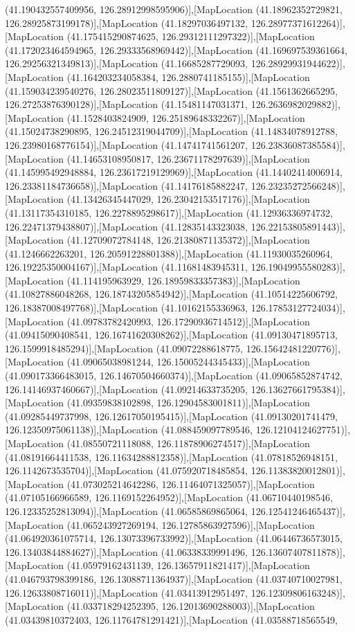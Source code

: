 (41.190432557409956, 126.28912998595906)],[MapLocation (41.18962352729821, 126.28925873199178)],[MapLocation (41.18297036497132, 126.28977371612264)],[MapLocation (41.175415290874625, 126.29312111297322)],[MapLocation (41.172023464594965, 126.29333568969442)],[MapLocation (41.169697539361664, 126.29256321349813)],[MapLocation (41.16685287729093, 126.28929931944622)],[MapLocation (41.164203234058384, 126.2880741185155)],[MapLocation (41.159034239540276, 126.28023511809127)],[MapLocation (41.1561362665295, 126.27253876390128)],[MapLocation (41.15481147031371, 126.2636982029882)],[MapLocation (41.1528403824909, 126.25189648332267)],[MapLocation (41.15024738290895, 126.24512319044709)],[MapLocation (41.14834078912788, 126.23980168776154)],[MapLocation (41.14741741561207, 126.23836087385584)],[MapLocation (41.14653108950817, 126.23671178297639)],[MapLocation (41.145995492948884, 126.23617219129969)],[MapLocation (41.14402414006914, 126.23381184736658)],[MapLocation (41.14176185882247, 126.23235272566248)],[MapLocation (41.13426345447029, 126.23042153517176)],[MapLocation (41.13117354310185, 126.2278895298617)],[MapLocation (41.12936336974732, 126.22471379438807)],[MapLocation (41.12835143323038, 126.22153805891443)],[MapLocation (41.12709072784148, 126.21380871135372)],[MapLocation (41.1246662263201, 126.20591228801388)],[MapLocation (41.11930035260964, 126.19225350004167)],[MapLocation (41.11681483945311, 126.19049955580283)],[MapLocation (41.114195963929, 126.18959833357383)],[MapLocation (41.10827886048268, 126.18743205854942)],[MapLocation (41.10514225606792, 126.18387008497768)],[MapLocation (41.10162155336963, 126.17853127724034)],[MapLocation (41.09783782420993, 126.17290936714512)],[MapLocation (41.09415090408541, 126.16741620308262)],[MapLocation (41.09130471895713, 126.1599918485294)],[MapLocation (41.09072288618775, 126.15642481220776)],[MapLocation (41.09065038981244, 126.15005244345433)],[MapLocation (41.090173366483015, 126.14670504660374)],[MapLocation (41.09065852874742, 126.14146937460667)],[MapLocation (41.09214633735205, 126.13627661795384)],[MapLocation (41.09359838102898, 126.12904583001811)],[MapLocation (41.09285449737998, 126.12617050195415)],[MapLocation (41.09130201741479, 126.12350975061138)],[MapLocation (41.088459097789546, 126.12104124627751)],[MapLocation (41.08550721118088, 126.11878906274517)],[MapLocation (41.08191664411538, 126.11634288812358)],[MapLocation (41.07818526948151, 126.1142673535704)],[MapLocation (41.075920718485854, 126.11383820012801)],[MapLocation (41.073025214642286, 126.11464071325057)],[MapLocation (41.07105166966589, 126.1169152264952)],[MapLocation (41.06710440198546, 126.12335252813094)],[MapLocation (41.06585869865064, 126.12541246465437)],[MapLocation (41.065243927269194, 126.12785863927596)],[MapLocation (41.064920361075714, 126.13073396733992)],[MapLocation (41.06446736573015, 126.13403844884627)],[MapLocation (41.06338339991496, 126.13607407811878)],[MapLocation (41.05979162431139, 126.13657911821417)],[MapLocation (41.046793798399186, 126.13088711364937)],[MapLocation (41.03740710027981, 126.12633808716011)],[MapLocation (41.03413912951497, 126.12309806163248)],[MapLocation (41.033718294252395, 126.12013690288003)],[MapLocation (41.03439810372403, 126.11764781291421)],[MapLocation (41.03588718565549, 